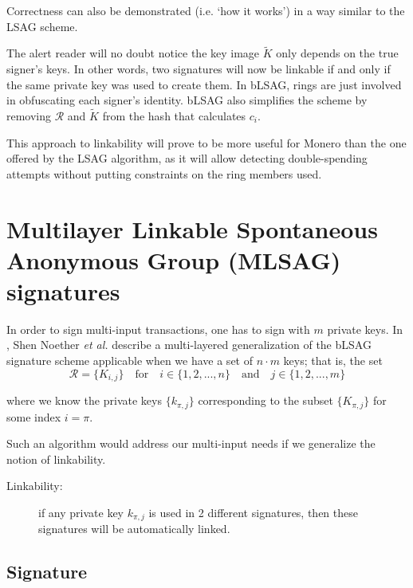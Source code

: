 Correctness can also be demonstrated (i.e. `how it works') in a way similar to the LSAG scheme.

The alert reader will no doubt notice the key image $\tilde{K}$ only depends on the true signer's keys. In other words, two signatures will now be linkable if and only if the same private key was used to create them. In bLSAG, rings are just involved in obfuscating each signer’s identity. bLSAG also simplifies the scheme by removing $\mathcal{R}$ and $\tilde{K}$ from the hash that calculates $c_i$.

This approach to linkability will prove to be more useful for Monero than the one offered by the LSAG algorithm, as it will allow detecting double-spending attempts without putting constraints on the ring members used.



\section{Multilayer Linkable Spontaneous Anonymous Group (MLSAG) signatures}
\label{sec:MLSAG}

In order to sign multi-input transactions, one has to sign with \(m\) private keys. In \cite{MRL-0005}, Shen Noether {\em et al.} describe a multi-layered generalization of the bLSAG signature scheme applicable when we have a set of \(n \cdot m\) keys; that is, the set\vspace{.2cm}
\[\mathcal{R} = \{ K_{i,j} \}  \quad \textrm{for} \quad  i \in \{1, 2, ..., n\} \quad \textrm{and} \quad j \in \{1, 2, ..., m\}\] 

where we know the private keys \(\{k_{\pi, j} \} \) corresponding to the subset \(\{K_{\pi, j}\} \) for some index \(i = \pi\).

Such an algorithm would address our multi-input needs if we generalize the notion of linkability.
\begin{description}
	\item[Linkability:] if any private key \(k_{\pi, j}\) is used in 2 different signatures, then these signatures will be automatically linked.
\end{description}


\subsection*{Signature}

